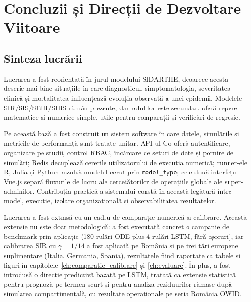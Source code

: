 
\chapter*{Concluzii și Direcții de Dezvoltare Viitoare}
\label{ch:concluzii}

{}
\section*{Sinteza lucrării}
\label{sec:sinteza_contributii}

Lucrarea a fost reorientată în jurul modelului SIDARTHE, deoarece
acesta descrie mai bine situațiile în care diagnosticul, simptomatologia,
severitatea clinică și mortalitatea influențează evoluția observată a unei
epidemii. Modelele SIR/SIS/SEIR/SIRS rămân prezente, dar rolul lor este
secundar: oferă repere matematice și numerice simple, utile pentru comparații și
verificări de regresie.

Pe această bază a fost construit un sistem software în care datele, simulările și
metricile de performanță sunt tratate unitar. API-ul Go oferă autentificare,
organizare pe studii, control RBAC, încărcare de seturi de date și pornire de
simulări; Redis decuplează cererile utilizatorului de execuția numerică;
runner-ele R, Julia și Python rezolvă modelul cerut prin
\texttt{model\_type}; cele două interfețe Vue.js separă fluxurile de lucru ale
cercetătorilor de operațiile globale ale super-adminilor. Contribuția practică a
sistemului constă în această legătură între model, execuție, izolare
organizațională și observabilitatea rezultatelor.

Lucrarea a fost extinsă cu un cadru de comparație numerică și calibrare.
Această extensie nu este doar metodologică: a fost executată concret o
campanie de benchmark prin aplicație (180 rulări ODE plus 4 rulări LSTM, fără
eșecuri), iar calibrarea SIR cu $\gamma = 1/14$ a fost aplicată pe România
și pe trei țări europene suplimentare (Italia, Germania, Spania), rezultatele
fiind raportate ca tabele și figuri în capitolele~\ref{ch:comparatie_calibrare}
și~\ref{ch:evaluare}. În plus, a fost introdusă o direcție predictivă bazată
pe LSTM, tratată ca extensie statistică pentru prognoză pe termen scurt și
pentru analiza reziduurilor rămase după simularea compartimentală, cu rezultate
operaționale pe seria România OWID.

